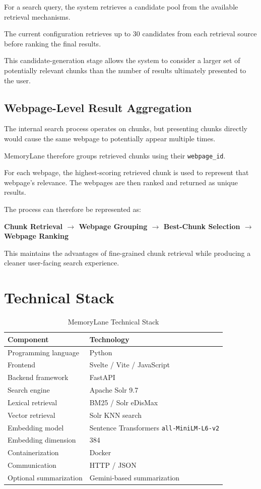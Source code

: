 \documentclass{tietreport}
\begin{document}
For a search query, the system retrieves a candidate pool from
the available retrieval mechanisms.

The current configuration retrieves up to 30 candidates from
each retrieval source before ranking the final results.

This candidate-generation stage allows the system to consider
a larger set of potentially relevant chunks than the number of
results ultimately presented to the user.

\subsection{Webpage-Level Result Aggregation}

The internal search process operates on chunks, but presenting
chunks directly would cause the same webpage to potentially
appear multiple times.

MemoryLane therefore groups retrieved chunks using their
\texttt{webpage\_id}.

For each webpage, the highest-scoring retrieved chunk is used
to represent that webpage's relevance. The webpages are then
ranked and returned as unique results.

The process can therefore be represented as:

\begin{center}
\textbf{
Chunk Retrieval
$\rightarrow$
Webpage Grouping
$\rightarrow$
Best-Chunk Selection
$\rightarrow$
Webpage Ranking
}
\end{center}

This maintains the advantages of fine-grained chunk retrieval
while producing a cleaner user-facing search experience.

\section{Technical Stack}

\begin{table}[H]
\centering
\begin{tabular}{p{} p{}}
\toprule
\textbf{Component} & \textbf{Technology} \\
\midrule
Programming language & Python \\
Frontend & Svelte / Vite / JavaScript \\
Backend framework & FastAPI \\
Search engine & Apache Solr 9.7 \\
Lexical retrieval & BM25 / Solr eDisMax \\
Vector retrieval & Solr KNN search \\
Embedding model & Sentence Transformers \texttt{all-MiniLM-L6-v2} \\
Embedding dimension & 384 \\
Containerization & Docker \\
Communication & HTTP / JSON \\
Optional summarization & Gemini-based summarization \\
\bottomrule
\end{tabular}
\caption{MemoryLane Technical Stack}
\label{tab:techstack}
\end{table}
\end{document}
